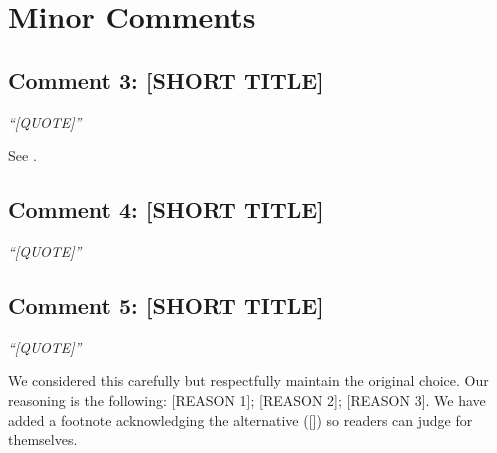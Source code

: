 \documentclass[11pt]{article}
\begin{document}
\section*{Minor Comments}

\subsection*{Comment 3: [SHORT TITLE]}

\textit{``[QUOTE]''}

\medskip
{} See .

\subsection*{Comment 4: [SHORT TITLE]}

\textit{``[QUOTE]''}

\medskip
\noindent [RESPONSE.]

\subsection*{Comment 5: [SHORT TITLE]}

\textit{``[QUOTE]''}

\medskip
\noindent We considered this carefully but respectfully maintain the
original choice. Our reasoning is the following: [REASON 1]; [REASON 2];
[REASON 3]. We have added a footnote acknowledging the alternative
([]) so readers can judge for themselves.
\end{document}
